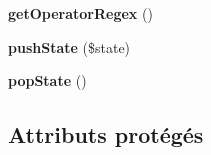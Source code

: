 \begin{DoxyCompactItemize}
\item 
{\bfseries get\+Operator\+Regex} ()\hypertarget{class_twig___lexer_a913a065161fe1951bffdd776414a6643}{}\label{class_twig___lexer_a913a065161fe1951bffdd776414a6643}

\item 
{\bfseries push\+State} (\$state)\hypertarget{class_twig___lexer_a6afabfaebdb88d6101172b462198eead}{}\label{class_twig___lexer_a6afabfaebdb88d6101172b462198eead}

\item 
{\bfseries pop\+State} ()\hypertarget{class_twig___lexer_a5f794f6e5f021c7755fb4dd8145f8f75}{}\label{class_twig___lexer_a5f794f6e5f021c7755fb4dd8145f8f75}

\end{DoxyCompactItemize}
\subsection*{Attributs protégés}
